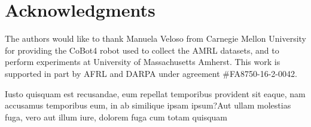 \documentclass[letterpaper]{article} %
\theoremstyle{definition}
\begin{document}
\vspace{-1.03mm}
\section{Acknowledgments}

The authors would like to thank Manuela Veloso from
Carnegie Mellon University for providing the CoBot4 robot
used to collect the AMRL datasets, and to perform experiments
at University of Massachusetts Amherst. This work is supported in part by AFRL
and DARPA under agreement \#FA8750-16-2-0042.

Iusto quisquam est recusandae, eum repellat temporibus provident sit eaque, nam accusamus temporibus eum, in ab similique ipsam ipsum?Aut ullam molestias fuga, vero aut illum iure, dolorem fuga cum totam quisquam


\end{document}
